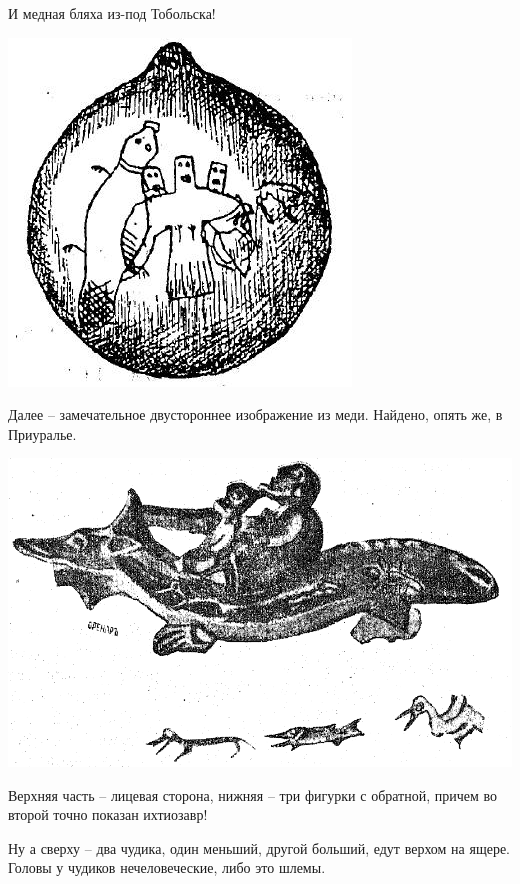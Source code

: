 И медная бляха из-под Тобольска!

\begin{center}
\includegraphics[width=0.65\linewidth]{chast-zmiy/ktotakiezmei/ural-bogi-07.jpg}
\end{center}
\vspace*{\fill}
\newpage

Далее – замечательное двустороннее изображение из меди. Найдено, опять же, в Приуралье.

\begin{center}
\includegraphics[width=\linewidth]{chast-zmiy/ktotakiezmei/ural-bogi-12.png}
\end{center}

Верхняя часть – лицевая сторона, нижняя – три фигурки с обратной, причем во второй точно показан ихтиозавр!

Ну а сверху – два чудика, один меньший, другой больший, едут верхом на ящере. Головы у чудиков нечеловеческие, либо это шлемы.


